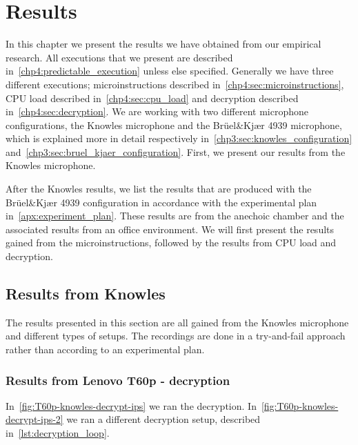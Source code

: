 \chapter{Results}
\label{chp5:results} 
In this chapter we present the results we have obtained from our empirical research. 
All executions that we present are described in~\autoref{chp4:predictable_execution} unless else specified. 
Generally we have three different executions; microinstructions described in~\autoref{chp4:sec:microinstructions}, CPU load described in~\autoref{chp4:sec:cpu_load} and decryption described in~\autoref{chp4:sec:decryption}. 
We are working with two different microphone configurations, the Knowles microphone and the Brüel\&Kjær 4939 microphone, which is explained more in detail respectively in~\autoref{chp3:sec:knowles_configuration} and~\autoref{chp3:sec:bruel_kjaer_configuration}.
First, we present our results from the Knowles microphone.

After the Knowles results, we list the results that are produced with the Brüel\&Kjær 4939 configuration in accordance with the experimental plan in~\autoref{apx:experiment_plan}. 
These results are from the anechoic chamber and the associated results from an office environment.  
We will first present the results gained from the microinstructions, followed by the results from CPU load and decryption. 

\section{Results from Knowles}\label{chp5:sec:knowles_results}
The results presented in this section are all gained from the Knowles microphone and different types of setups.
The recordings are done in a try-and-fail approach rather than according to an experimental plan. 

\subsection{Results from Lenovo T60p - decryption}\label{chp5:subsec:t60p_knowles_results_decryption}
In~\autoref{fig:T60p-knowles-decrypt-ips} we ran the decryption. 
In~\autoref{fig:T60p-knowles-decrypt-ips-2} we ran a different decryption setup, described in~\autoref{lst:decryption_loop}.

